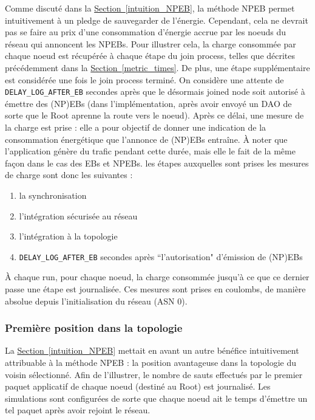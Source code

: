 \documentclass[]{report}
\newcommand{\wordlink}[2]{\hyperref[#2]{#1~\ref{#2}}}
\begin{document}
Comme discuté dans la \wordlink{Section}{intuition_NPEB}, la méthode NPEB permet intuitivement à un pledge de sauvegarder de l'énergie. Cependant, cela ne devrait pas se faire au prix d'une consommation d'énergie accrue par les noeuds du réseau qui annoncent les NPEBs. Pour illustrer cela, la charge consommée par chaque noeud est récupérée à chaque étape du join process, telles que décrites précédemment dans la \wordlink{Section}{metric_times}. De plus, une étape supplémentaire est considérée une fois le join process terminé. On considère une attente de \texttt{DELAY\_LOG\_AFTER\_EB} secondes après que le désormais joined node soit autorisé à émettre des (NP)EBs (dans l'implémentation, après avoir envoyé un DAO de sorte que le Root aprenne la route vers le noeud). Après ce délai, une mesure de la charge est prise : elle a pour objectif de donner une indication de la consommation énergétique que l'annonce de (NP)EBs entraîne. À noter que l'application génère du trafic pendant cette durée, mais elle le fait de la même façon dans le cas des EBs et NPEBs. les étapes auxquelles sont prises les mesures de charge sont donc les suivantes :

\begin{enumerate}
\item la synchronisation
\item l'intégration sécurisée au réseau
\item l'intégration à la topologie 
\item \texttt{DELAY\_LOG\_AFTER\_EB} secondes après ``l'autorisation" d'émission de (NP)EBs
\end{enumerate}
\vspace{0.2cm}
À chaque run, pour chaque noeud, la charge consommée jusqu'à ce que ce dernier passe une étape est journalisée. Ces mesures sont prises en coulombs, de manière absolue depuis l'initialisation du réseau (ASN 0).

\subsubsection{Première position dans la topologie}

La \wordlink{Section}{intuition_NPEB} mettait en avant un autre bénéfice intuitivement attribuable à la méthode NPEB : la position avantageuse dans la topologie du voisin sélectionné. Afin de l'illustrer, le nombre de sauts effectués par le premier paquet applicatif de chaque noeud (destiné au Root) est journalisé. Les simulations sont configurées de sorte que chaque noeud ait le temps d'émettre un tel paquet après avoir rejoint le réseau.
\end{document}
